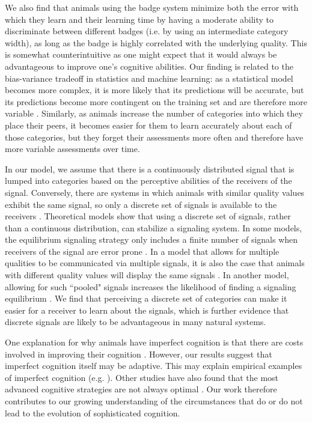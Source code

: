 We also find that animals using the badge system minimize both the error with which they learn and their learning time by having a moderate ability to discriminate between different badges (i.e. by using an intermediate category width), as long as the badge is highly correlated with the underlying quality. This is somewhat counterintuitive as one might expect that it would always be advantageous to improve one's cognitive abilities. Our finding is related to the bias-variance tradeoff in statistics and machine learning: as a statistical model becomes more complex, it is more likely that its predictions will be accurate, but its predictions become more contingent on the training set and are therefore more variable \citep{Domingos:2000cr,Briscoe:2011nx}. Similarly, as animals increase the number of categories into which they place their peers, it becomes easier for them to learn accurately about each of those categories, but they forget their assessments more often and therefore have more variable assessments over time. 

In our model, we assume that there is a continuously distributed signal that is lumped into categories based on the perceptive abilities of the receivers of the signal. Conversely, there are systems in which animals with similar quality values exhibit the same signal, so only a discrete set of signals is available to the receivers \citep{Johnstone:1994uq}. Theoretical models show that using a discrete set of signals, rather than a continuous distribution, can stabilize a signaling system. In some models, the equilibrium signaling strategy only includes a finite number of signals when receivers of the signal are error prone \citep{Grafen:1993kx,Johnstone:1994uq}. In a model that allows for multiple qualities to be communicated via multiple signals, it is also the case that animals with different quality values will display the same signals \citep{Johnstone:1995vn}. In another model, allowing for such ``pooled" signals increases the likelihood of finding a signaling equilibrium \citep{Lachmann:1998fk}. We find that perceiving a discrete set of categories can make it easier for a receiver to learn about the signals, which is further evidence that discrete signals are likely to be advantageous in many natural systems.


One explanation for why animals have imperfect cognition is that there are costs involved in improving their cognition \citep{Dunbar:1992ys,Laughlin:1998ly,Laughlin:2001qf,Gavrilets:2006fk,MacIver:2010ve}. However, our results suggest that imperfect cognition itself may be adaptive. This may explain empirical examples of imperfect cognition (e.g. \citep{Kikuchi:2010ys}).
Other studies have also found that the most advanced cognitive strategies are not always optimal \citep{Stephens:1991fk,Kerr:2003vn,Dunlap:2009vn}. Our work therefore contributes to our growing understanding of the circumstances that do or do not lead to the evolution of sophisticated cognition.

